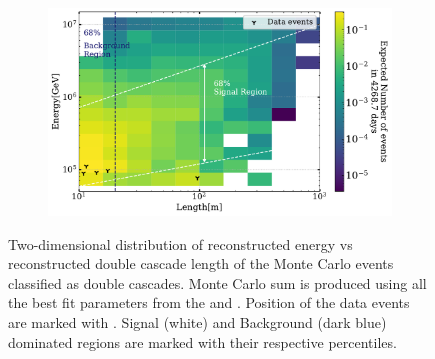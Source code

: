 \begin{figure}[h]
    \begin{subfigure}{0.8\textwidth}
        \includegraphics{./figures/results/DataMC_IC86_pass2_SnowStorm_v2_Bfr_DoubleCascadesLvsE_2D_withData.pdf}
    \end{subfigure}
    
    \caption[Two dimensional PDF of length vs Energy of double cascade sample at best fit showing data events positions]{Two-dimensional distribution of reconstructed energy vs reconstructed double cascade length of the Monte Carlo events classified as double cascades. Monte Carlo sum is produced using all the best fit parameters from the  and . Position of the data events are marked with \wye[rotate=180]. Signal (white) and Background (dark blue) dominated regions are marked with their respective percentiles.}
\end{figure}

